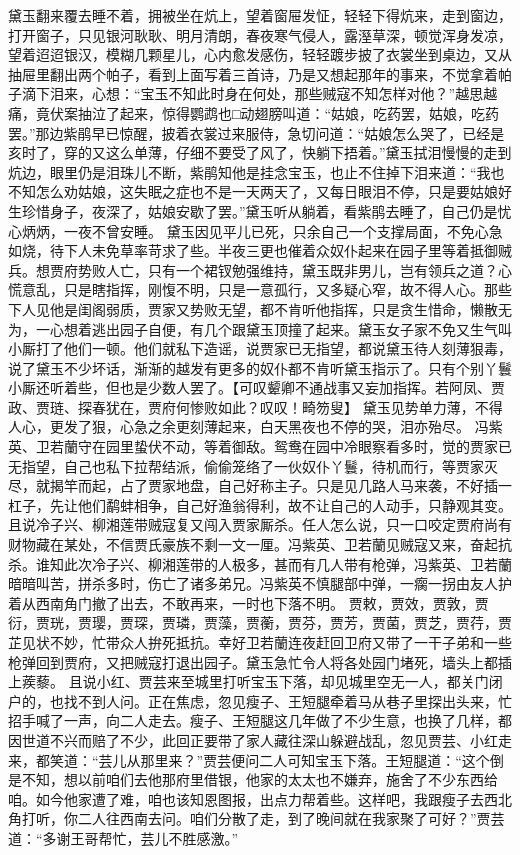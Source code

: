 \documentclass[12pt,oneside]{book}
\begin{document}
黛玉翻来覆去睡不着，拥被坐在炕上，望着窗屉发怔，轻轻下得炕来，走到窗边，打开窗子，只见银河耿耿、明月清朗，春夜寒气侵人，露溼草深，顿觉浑身发凉，望着迢迢银汉，模糊几颗星儿，心内愈发感伤，轻轻踱步披了衣裳坐到桌边，又从抽屉里翻出两个帕子，看到上面写着三首诗，乃是又想起那年的事来，不觉拿着帕子滴下泪来，心想：“宝玉不知此时身在何处，那些贼寇不知怎样对他？”越思越痛，竟伏案抽泣了起来，惊得鹦鹉也□动翅膀叫道：“姑娘，吃药罢，姑娘，吃药罢。”那边紫鹃早已惊醒，披着衣裳过来服侍，急切问道：“姑娘怎么哭了，已经是亥时了，穿的又这么单薄，仔细不要受了风了，快躺下捂着。”黛玉拭泪慢慢的走到炕边，眼里仍是泪珠儿不断，紫鹃知他是挂念宝玉，也止不住掉下泪来道：“我也不知怎么劝姑娘，这失眠之症也不是一天两天了，又每日眼泪不停，只是要姑娘好生珍惜身子，夜深了，姑娘安歇了罢。”黛玉听从躺着，看紫鹃去睡了，自己仍是忧心炳炳，一夜不曾安睡。
黛玉因见平儿已死，只余自己一个支撑局面，不免心急如烧，待下人未免草率苛求了些。半夜三更也催着众奴仆起来在园子里等着抵御贼兵。想贾府势败人亡，只有一个裙钗勉强维持，黛玉既非男儿，岂有领兵之道？心慌意乱，只是瞎指挥，刚愎不明，只是一意孤行，又多疑心窄，故不得人心。那些下人见他是闺阁弱质，贾家又势败无望，都不肯听他指挥，只是贪生惜命，懒散无为，一心想着逃出园子自便，有几个跟黛玉顶撞了起来。黛玉女子家不免又生气叫小厮打了他们一顿。他们就私下造谣，说贾家已无指望，都说黛玉待人刻薄狠毒，说了黛玉不少坏话，渐渐的越发有更多的奴仆都不肯听黛玉指示了。只有个别丫鬟小厮还听着些，但也是少数人罢了。【可叹颦卿不通战事又妄加指挥。若阿凤、贾政、贾琏、探春犹在，贾府何惨败如此？叹叹！畸笏叟】
黛玉见势单力薄，不得人心，更发了狠，心急之余更刻薄起来，白天黑夜也不停的哭，泪亦殆尽。
冯紫英、卫若蘭守在园里蛰伏不动，等着御敌。鸳鸯在园中冷眼察看多时，觉的贾家已无指望，自己也私下拉帮结派，偷偷笼络了一伙奴仆丫鬟，待机而行，等贾家灭尽，就揭竿而起，占了贾家地盘，自己好称主子。只是见几路人马来袭，不好插一杠子，先让他们鹬蚌相争，自己好渔翁得利，故不让自己的人动手，只静观其变。
且说冷子兴、柳湘莲带贼寇复又闯入贾家厮杀。任人怎么说，只一口咬定贾府尚有财物藏在某处，不信贾氏豪族不剩一文一厘。冯紫英、卫若蘭见贼寇又来，奋起抗杀。谁知此次冷子兴、柳湘莲带的人极多，甚而有几人带有枪弹，冯紫英、卫若蘭暗暗叫苦，拼杀多时，伤亡了诸多弟兄。冯紫英不慎腿部中弹，一瘸一拐由友人护着从西南角门撤了出去，不敢再来，一时也下落不明。
贾敕，贾效，贾敦，贾衍，贾珖，贾璎，贾琛，贾璘，贾藻，贾蘅，贾芬，贾芳，贾菌，贾芝，贾荇，贾芷见状不妙，忙带众人拚死抵抗。幸好卫若蘭连夜赶回卫府又带了一干子弟和一些枪弹回到贾府，又把贼寇打退出园子。黛玉急忙令人将各处园门堵死，墙头上都插上蒺藜。
且说小红、贾芸来至城里打听宝玉下落，却见城里空无一人，都关门闭户的，也找不到人问。正在焦虑，忽见瘦子、王短腿牵着马从巷子里探出头来，忙招手喊了一声，向二人走去。瘦子、王短腿这几年做了不少生意，也换了几样，都因世道不兴而赔了不少，此回正要带了家人藏往深山躲避战乱，忽见贾芸、小红走来，都笑道：“芸儿从那里来？”贾芸便问二人可知宝玉下落。王短腿道：“这个倒是不知，想以前咱们去他那府里借银，他家的太太也不嫌弃，施舍了不少东西给咱。如今他家遭了难，咱也该知恩图报，出点力帮着些。这样吧，我跟瘦子去西北角打听，你二人往西南去问。咱们分散了走，到了晚间就在我家聚了可好？”贾芸道：“多谢王哥帮忙，芸儿不胜感激。”
\end{document}
